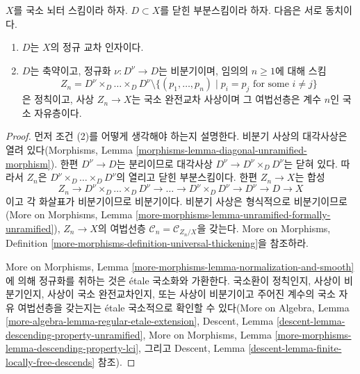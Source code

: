 \begin{lemma}
\label{lemma-characterize-normal-crossings-normalization}
$X$를 국소 뇌터 스킴이라 하자. $D \subset X$를 닫힌 부분스킴이라 하자.
다음은 서로 동치이다.
\begin{enumerate}
\item $D$는 $X$의 정규 교차 인자이다.
\item $D$는 축약이고, 정규화 $\nu : D^\nu \to D$는 비분기이며,
임의의 $n \geq 1$에 대해 스킴
$$
Z_n = D^\nu \times_D \ldots \times_D D^\nu
\setminus \{(p_1, \ldots, p_n) \mid p_i = p_j\text{ for some }i\not = j\}
$$
은 정칙이고, 사상 $Z_n \to X$는 국소 완전교차 사상이며
그 여법선층은 계수 $n$인 국소 자유층이다.
\end{enumerate}
\end{lemma}

\begin{proof}
먼저 조건 (2)를 어떻게 생각해야 하는지 설명한다.
비분기 사상의 대각사상은 열려 있다(Morphisms, Lemma
\ref{morphisms-lemma-diagonal-unramified-morphism}).
한편 $D^\nu \to D$는 분리이므로 대각사상
$D^\nu \to D^\nu \times_D D^\nu$는 닫혀 있다.
따라서 $Z_n$은 $D^\nu \times_D \ldots \times_D D^\nu$의
열리고 닫힌 부분스킴이다. 한편 $Z_n \to X$는 합성
$$
Z_n \to D^\nu \times_D \ldots \times_D D^\nu \to \ldots \to
D^\nu \times_D D^\nu \to D^\nu \to D \to X
$$
이고 각 화살표가 비분기이므로 비분기이다.
비분기 사상은 형식적으로 비분기이므로(More on Morphisms, Lemma
\ref{more-morphisms-lemma-unramified-formally-unramified}),
$Z_n \to X$의 여법선층
$\mathcal{C}_n = \mathcal{C}_{Z_n/X}$을 갖는다. More on Morphisms,
Definition \ref{more-morphisms-definition-universal-thickening}을 참조하라.

\medskip\noindent
More on Morphisms, Lemma
\ref{more-morphisms-lemma-normalization-and-smooth}에 의해
정규화를 취하는 것은 \'etale 국소화와 가환한다.
국소환이 정칙인지, 사상이 비분기인지, 사상이 국소 완전교차인지,
또는 사상이 비분기이고 주어진 계수의 국소 자유 여법선층을 갖는지는
\'etale 국소적으로 확인할 수 있다(More on Algebra, Lemma
\ref{more-algebra-lemma-regular-etale-extension},
Descent, Lemma \ref{descent-lemma-descending-property-unramified},
More on Morphisms, Lemma
\ref{more-morphisms-lemma-descending-property-lci}, 그리고
Descent, Lemma \ref{descent-lemma-finite-locally-free-descends} 참조).


\end{proof}
